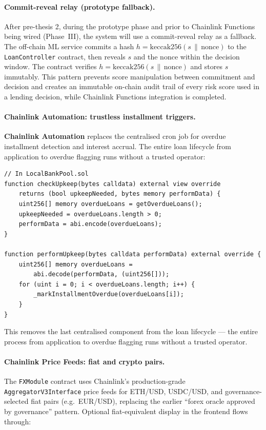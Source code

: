 \documentclass[12pt, a4paper]{report}
\begin{document}
\paragraph{Commit-reveal relay (prototype fallback).}
After pre-thesis 2, during the prototype phase and prior to Chainlink Functions being wired (Phase~III), the system will use a commit-reveal relay as a fallback. The off-chain ML service commits a hash $h = \text{keccak256}(s \,\|\, \text{nonce})$ to the \texttt{LoanController} contract, then reveals $s$ and the nonce within the decision window. The contract verifies $h = \text{keccak256}(s \,\|\, \text{nonce})$ and stores $s$ immutably. This pattern prevents score manipulation between commitment and decision and creates an immutable on-chain audit trail of every risk score used in a lending decision, while Chainlink Functions integration is completed.

\paragraph{Chainlink Automation: trustless installment triggers.}
\textbf{Chainlink Automation} replaces the centralised cron job for overdue installment detection and interest accrual. The entire loan lifecycle from application to overdue flagging runs without a trusted operator:

\begin{verbatim}
// In LocalBankPool.sol
function checkUpkeep(bytes calldata) external view override
    returns (bool upkeepNeeded, bytes memory performData) {
    uint256[] memory overdueLoans = getOverdueLoans();
    upkeepNeeded = overdueLoans.length > 0;
    performData = abi.encode(overdueLoans);
}

function performUpkeep(bytes calldata performData) external override {
    uint256[] memory overdueLoans =
        abi.decode(performData, (uint256[]));
    for (uint i = 0; i < overdueLoans.length; i++) {
        _markInstallmentOverdue(overdueLoans[i]);
    }
}
\end{verbatim}

This removes the last centralised component from the loan lifecycle --- the entire process from application to overdue flagging runs without a trusted operator.

\paragraph{Chainlink Price Feeds: fiat and crypto pairs.}
The \texttt{FXModule} contract uses Chainlink's production-grade \texttt{AggregatorV3Interface} price feeds for ETH/USD, USDC/USD, and governance-selected fiat pairs (e.g.\ EUR/USD), replacing the earlier ``forex oracle approved by governance'' pattern. Optional fiat-equivalent display in the frontend flows through:
\end{document}
